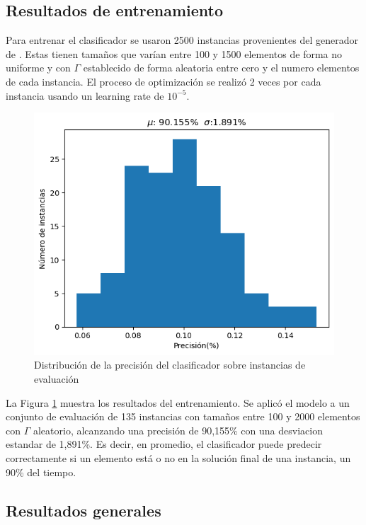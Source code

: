 \documentclass[spanish, a4paper, 12pt, openany,final]{book}
\begin{document}
\subsection*{Resultados de entrenamiento}

Para entrenar el clasificador se usaron 2500 instancias provenientes del generador de \cite{baldo_polynomial_2023}. Estas tienen tamaños que varían entre 100 y 1500 elementos de forma no uniforme y con $\Gamma$ establecido de forma aleatoria entre cero y el numero elementos de cada instancia. El proceso de optimización se realizó 2 veces por cada instancia usando un learning rate de $10^{-5}$.


\begin{figure}[h]
	\centering
			\includegraphics[scale=0.75]{graphs/training_performance.png}
	\caption{Distribución de la precisión del clasificador sobre instancias de evaluación}
	\label{fig:model_performance}
\end{figure}

La Figura \ref{fig:model_performance} muestra los resultados del entrenamiento. Se aplicó el modelo a un conjunto de evaluación de 135 instancias con tamaños entre 100 y 2000 elementos con $\Gamma$ aleatorio, alcanzando una precisión de 90,155\% con una desviacion estandar de 1,891\%. Es decir, en promedio, el clasificador puede predecir correctamente si un elemento está o no en la solución final de una instancia, un 90\% del tiempo.


\subsection*{Resultados generales}
\end{document}

